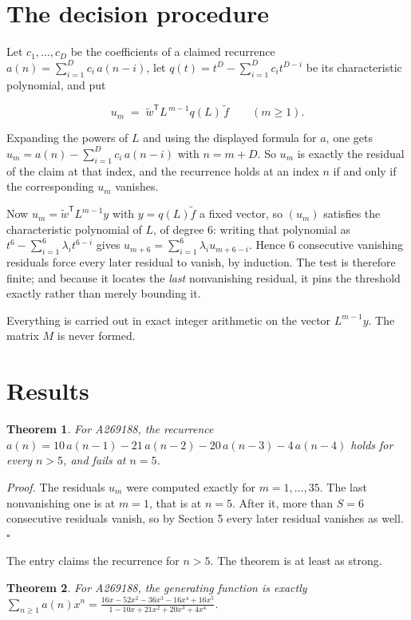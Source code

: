 \documentclass[11pt]{article}
\newtheorem{theorem}{Theorem}
\theoremstyle{definition}
\begin{document}
\section{The decision procedure}

Let $c_1,\dots,c_D$ be the coefficients of a claimed recurrence $a(n) = \sum_{i=1}^{D} c_i\,a(n-i)$, let $q(t) = t^{D} - \sum_{i=1}^{D} c_i t^{D-i}$ be its characteristic polynomial, and put

\[u_m \;=\; \tilde w^{\mathsf T} L^{\,m-1} q(L)\,\tilde f \qquad (m \ge 1).\]

Expanding the powers of $L$ and using the displayed formula for $a$, one gets $u_m = a(n) - \sum_{i=1}^{D} c_i\,a(n-i)$ with $n = m + D$. So $u_m$ is exactly the residual of the claim at that index, and the recurrence holds at an index $n$ if and only if the corresponding $u_m$ vanishes.

Now $u_m = \tilde w^{\mathsf T} L^{m-1} y$ with $y = q(L)\tilde f$ a fixed vector, so $(u_m)$ satisfies the characteristic polynomial of $L$, of degree $6$: writing that polynomial as $t^{6} - \sum_{i=1}^{6} \lambda_i t^{6-i}$ gives $u_{m+6} = \sum_{i=1}^{6} \lambda_i u_{m+6-i}$. Hence $6$ consecutive vanishing residuals force every later residual to vanish, by induction. The test is therefore finite; and because it locates the {\itshape last} nonvanishing residual, it pins the threshold exactly rather than merely bounding it.

Everything is carried out in exact integer arithmetic on the vector $L^{m-1}y$. The matrix $M$ is never formed.

\section{Results}

\begin{theorem} For A269188, the recurrence $a(n) = 10\,a(n-1) - 21\,a(n-2) - 20\,a(n-3) - 4\,a(n-4)$ holds for every $n > 5$, and fails at $n = 5$.\end{theorem}

{\itshape Proof.} The residuals $u_m$ were computed exactly for $m = 1,\dots,35$. The last nonvanishing one is at $m = 1$, that is at $n = 5$. After it, more than $S = 6$ consecutive residuals vanish, so by Section 5 every later residual vanishes as well. $\square$

The entry claims the recurrence for $n > 5$. The theorem is at least as strong.

\begin{theorem} For A269188, the generating function is exactly $\sum_{n\ge 1} a(n)x^n = \frac{16x - 52x^{2} - 36x^{3} - 16x^{4} + 16x^{5}}{1 - 10x + 21x^{2} + 20x^{3} + 4x^{4}}$.\end{theorem}
\end{document}
